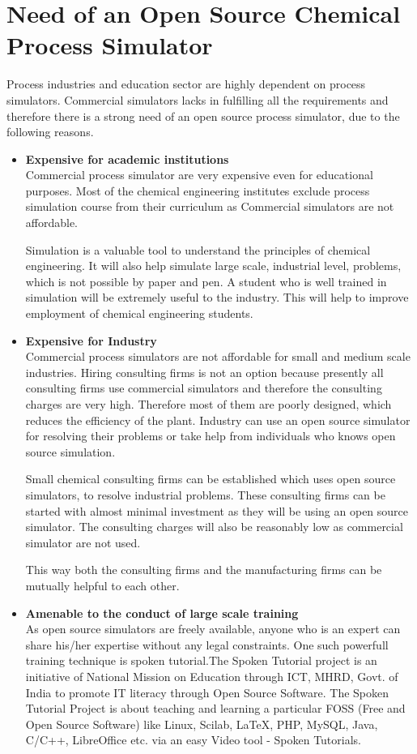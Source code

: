 \documentclass[12pt]{report}
\begin{document}
\section{Need of an Open Source Chemical Process Simulator}
Process industries and education sector are highly dependent on process simulators. Commercial simulators lacks in fulfilling all the requirements and therefore there is a strong need of an open source process simulator, due to the following reasons.
\begin{itemize}
\item{\textbf{Expensive for academic institutions}} \\
Commercial process simulator are very expensive even for educational purposes. Most of the chemical engineering institutes exclude process simulation course from their curriculum as Commercial simulators are not affordable.

Simulation is a valuable tool to understand the principles of chemical engineering. It will also help simulate large scale, industrial level, problems, which is not possible by paper and pen. A student who is well trained in simulation will be extremely useful to the industry. This will help to improve employment of chemical engineering students.

\item{\textbf{Expensive for Industry}} \\
Commercial process simulators are not affordable for small and medium scale industries. Hiring consulting firms is not an option because presently all consulting firms use commercial simulators and therefore the consulting charges are very high. Therefore most of them are poorly designed, which reduces the efficiency of the plant. Industry can use an open source simulator for resolving their problems or take help from individuals who knows open source simulation.

Small chemical consulting firms can be established which uses open source simulators, to resolve industrial problems. These consulting firms can be started with almost minimal investment as they will be using an open source simulator. The consulting charges will also be reasonably low as commercial simulator are not used.

This way both the consulting firms and the manufacturing firms can be mutually helpful to each other.

\item{\textbf{Amenable to the conduct of large scale training}} \\
As open source simulators are freely available, anyone who is an expert can share his/her expertise without any legal constraints. One such powerfull training technique is spoken tutorial.The Spoken Tutorial project is an initiative of National Mission on Education through ICT, MHRD, Govt. of India to promote IT literacy through Open Source Software. The Spoken Tutorial Project is about teaching and learning a particular FOSS (Free and Open Source Software) like Linux, Scilab, LaTeX, PHP, MySQL, Java, C/C++, LibreOffice etc. via an easy Video tool - Spoken Tutorials. 


\end{itemize}
\end{document}
